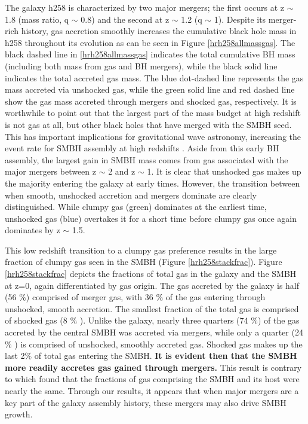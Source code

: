 \documentclass[]{emulateapj}
\begin{document}
The galaxy h258 is characterized by two major mergers; the first occurs at z $\sim$ 1.8 (mass ratio, q $\sim$ 0.8) and the second at z $\sim$ 1.2 (q $\sim$ 1). Despite its merger-rich history, gas accretion smoothly increases the cumulative black hole mass in h258 throughout its evolution as can be seen in Figure \ref{hrh258allmassgas}. The black dashed line in \ref{hrh258allmassgas} indicates the total cumulative BH mass (including both mass from gas and BH mergers), while the black solid line indicates the total accreted gas mass. The blue dot-dashed line represents the gas mass accreted via unshocked gas, while the green solid line and red dashed line show the gas mass accreted through mergers and shocked gas, respectively. It is worthwhile to point out that the largest part of the mass budget at high redshift is not gas at all, but other black holes that have merged with the SMBH seed. This has important implications for gravitational wave astronomy, increasing the event rate for SMBH assembly at high redshifts \citep{Holley-Bockelmann2010}. Aside from this early BH assembly, the largest gain in SMBH mass comes from gas associated with the major mergers between z $\sim$ 2 and z $\sim$ 1. It is clear that unshocked gas makes up the majority entering the galaxy at early times. However, the transition between when smooth, unshocked accretion and mergers dominate are clearly distinguished. While clumpy gas (green) dominates at the earliest time, unshocked gas (blue) overtakes it for a short time before clumpy gas once again dominates by z $\sim$ 1.5. 

This low redshift transition to a clumpy gas preference results in the large fraction of clumpy gas seen in the SMBH (Figure \ref{hrh258stackfrac}). Figure \ref{hrh258stackfrac} depicts the fractions of total gas in the galaxy and the SMBH at z=0, again differentiated by gas origin. The gas accreted by the galaxy is half (56 $\%$) comprised of merger gas, with 36 $\%$ of the gas entering through unshocked, smooth accretion. The smallest fraction of the total gas is comprised of shocked gas (8 $\%$ ). Unlike the galaxy, nearly three quarters (74 $\%$) of the gas accreted by the central SMBH was accreted via mergers, while only a quarter (24 $\%$ ) is comprised of unshocked, smoothly accreted gas. Shocked gas makes up the last 2$\%$ of total gas entering the SMBH. \textbf{It is evident then that the SMBH more readily accretes gas gained through mergers.} This result is contrary to \cite{Bellovary2013} which found that the fractions of gas comprising the SMBH and its host were nearly the same. Through our results, it appears that when major mergers are a key part of the galaxy assembly history, these mergers may also drive SMBH growth.
\end{document}
